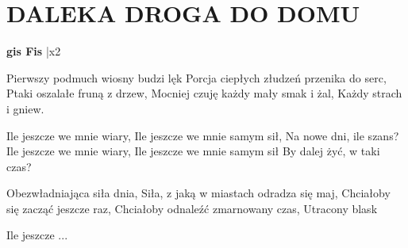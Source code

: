 \documentclass[../../../songbook.tex]{subfiles}
\begin{document}
\TabPositions{8cm} %
\section*{DALEKA DROGA DO DOMU}
{}
\vspace{0.5cm}
{\color{red}\textbf{gis Fis} } |x2 \newline

Pierwszy podmuch wiosny budzi lęk \newline
Porcja ciepłych złudzeń przenika do serc, \newline
Ptaki oszalałe fruną z drzew, \newline
Mocniej czuję każdy mały smak i żal,  \newline
Każdy strach i gniew. \newline

\-\hspace{1cm} Ile jeszcze we mnie wiary,  \newline
\-\hspace{1cm} Ile jeszcze we mnie samym sił, \newline
\-\hspace{1cm} Na nowe dni, ile szans?  \newline
\-\hspace{1cm} Ile jeszcze we mnie wiary, \newline
\-\hspace{1cm} Ile jeszcze we mnie samym sił \newline
\-\hspace{1cm} By dalej żyć, w taki czas? \newline

Obezwładniająca siła dnia, \newline
Siła, z jaką w miastach odradza się maj, \newline
Chciałoby się zacząć jeszcze raz, \newline
Chciałoby odnaleźć zmarnowany czas, \newline
Utracony blask \newline

\-\hspace{1cm} Ile jeszcze ... 
\end{document}

